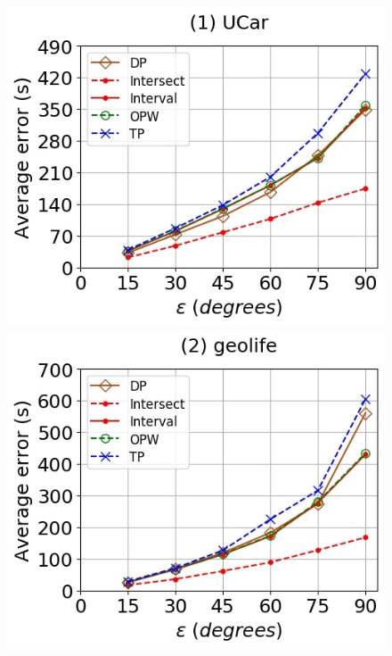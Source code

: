 {\begin{figure}[tb!]
	\centering
	\includegraphics[scale = 0.250]{Figures/Exp-when-DAD-error-epsilon-service.jpg}\hspace{0.5ex}
	\includegraphics[scale = 0.250]{Figures/Exp-when-DAD-error-epsilon-geolife.jpg}\hspace{0.5ex}

\end{figure}}
